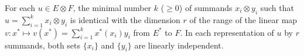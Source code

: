 For each $u \in E \otimes F$, the minimal number $k$ ($\geq 0$) of summands $x_i \otimes y_i$ such that $u = \sum_{i=1}^{k} x_i \otimes y_i$ is identical with the dimension $r$ of the range of the linear map $v: x^* \mapsto v(x^*) = \sum_{i=1}^{k} x^*(x_i) y_i$ from $E^*$ to $F$. In each representation of $u$ by $r$ summands, both sets $\{x_i\}$ and $\{y_i\}$ are linearly independent.
